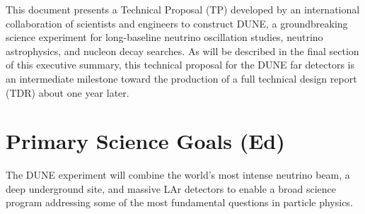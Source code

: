 


This document presents 
a Technical Proposal (TP) developed by an international collaboration of scientists and engineers to construct DUNE,
a groundbreaking science experiment for long-baseline neutrino oscillation studies, neutrino astrophysics, and nucleon decay searches. As will be described in the final section of this executive summary, this technical proposal for the DUNE far detectors is an intermediate milestone toward the production of a full technical design report (TDR) about one year later.


%

\section{Primary Science Goals (Ed)}


The DUNE experiment will combine the world's most intense neutrino beam, a deep underground site, and massive LAr detectors to enable a broad science program addressing some of the most fundamental questions in particle physics. 

